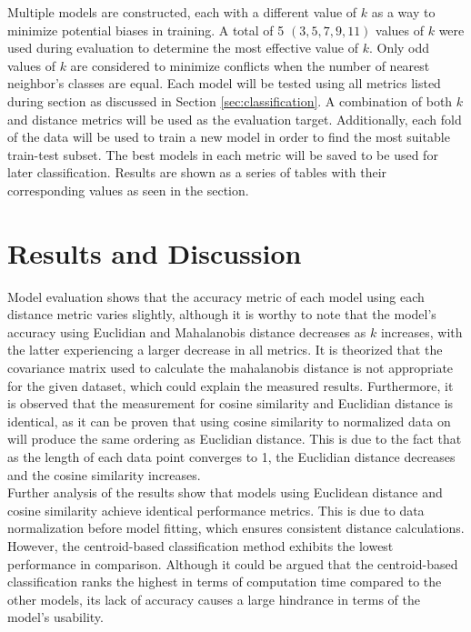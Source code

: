 \documentclass[twocolumn, a4paper, 8pt]{article}
\newcommand{\sups}[1]{\textsuperscript{#1}}
\begin{document}
	Multiple models are constructed, each with a different value of $k$ as a way to minimize potential biases in training. A total of 5 $(3,5,7,9,11)$ values of $k$ were used during evaluation to determine the most effective value of $k$. Only odd values of $k$ are considered to minimize conflicts when the number of nearest neighbor's classes are equal. Each model will be tested using all metrics listed during section as discussed in Section \ref{sec:classification}. A combination of both $k$ and distance metrics will be used as the evaluation target. Additionally, each fold of the data will be used to train a new model in order to find the most suitable train-test subset. The best models in each metric will be saved to be used for later classification. Results are shown as a series of tables with their corresponding values as seen in the \hyperlink{appendix}{}
	section. 
	
	\section{Results and Discussion}
	Model evaluation shows that the accuracy metric of each model using each distance metric varies slightly, although it is worthy to note that the model's accuracy using Euclidian and Mahalanobis distance decreases as $k$ increases, with the latter experiencing a larger decrease in all metrics. It is theorized that the covariance matrix used to calculate the mahalanobis distance is not appropriate for the given dataset, which could explain the measured results. Furthermore, it is observed that the measurement for cosine similarity and Euclidian distance is identical, as it can be proven that using cosine similarity to normalized data on will produce the same ordering as Euclidian distance\sups{\cite{cosine_euclidian}}. This is due to the fact that as the length of each data point converges to 1, the Euclidian distance decreases and the cosine similarity increases.\\
	
	Further analysis of the results show that models using Euclidean distance and cosine similarity achieve identical performance metrics. This is due to data normalization before model fitting, which ensures consistent distance calculations. However, the centroid-based classification method exhibits the lowest performance in comparison. Although it could be argued that the centroid-based classification ranks the highest in terms of computation time compared to the other models, its lack of accuracy causes a large hindrance in terms of the model's usability.\\
	
\end{document}
